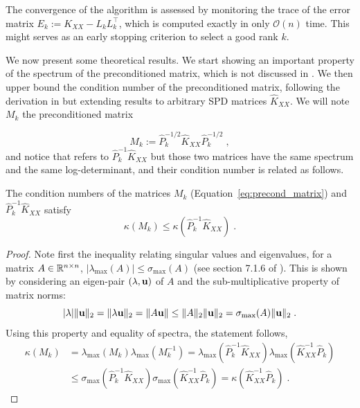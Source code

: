 \documentclass{article}
\begin{document}
The convergence of the algorithm is assessed by monitoring the trace of the error matrix $E_k := K_{XX} - L_kL_k^\top$, which is computed exactly in only $\mathcal O(n)$ time. This might serves as an early stopping criterion to select a good rank $k$. 

We now present some theoretical results. We start showing an important property of the spectrum of the preconditioned matrix, which is not discussed in \cite{gardner_gpytorch_2021}. We then upper bound the condition number of the preconditioned matrix, following the derivation in \cite{gardner_gpytorch_2021} but extending results to arbitrary SPD matrices $\widehat K_{XX}$. We will note $M_k$ the preconditioned matrix

\begin{equation} \label{eq:precond_matrix}
    M_k := \widehat P_k^{-1/2} \widehat K_{XX} \widehat P_k^{-1/2} \;,
\end{equation}
%
and notice that \cite{gardner_gpytorch_2021} refers to $\widehat P_k^{-1} \widehat K_{XX}$ but those two matrices have the same spectrum and the same log-determinant, and their condition number is related as follows.

\begin{proposition} \label{thm:condnums}
The condition numbers of the matrices $M_k$ (Equation~\eqref{eq:precond_matrix}) and $\widehat P_k^{-1} \widehat K_{XX}$ satisfy
\begin{equation*}
    \kappa(M_k) \le \kappa(\widehat P_k^{-1} \widehat K_{XX}) \;.
\end{equation*}
\end{proposition}
\begin{proof}
Note first the inequality relating singular values and eigenvalues, for a matrix $A \in \mathbb R^{n\times n}$, $|\lambda_{\max}(A)| \le \sigma_{\max}(A)$ (see section 7.1.6 of \cite{golub_matrix_2013}). This is shown by considering an eigen-pair $(\lambda, \boldsymbol{\mathbf{u}})$ of $A$ and the sub-multiplicative property of matrix norms:
\begin{equation*}
    |\lambda| \Vert \boldsymbol{\mathbf{u}} \Vert_2 = \Vert \lambda \boldsymbol{\mathbf{u}} \Vert_2 = \Vert A \boldsymbol{\mathbf{u}} \Vert \le \Vert A \Vert_2 \Vert \boldsymbol{\mathbf{u}} \Vert_2 = \sigma_{\max}(A) \Vert \boldsymbol{\mathbf{u}} \Vert_2 \;.
\end{equation*}
%
Using this property and equality of spectra, the statement follows,
\begin{align*}
    \kappa(M_k) &= \lambda_{\max}(M_k) \lambda_{\max}(M_k^{-1}) 
    = \lambda_{\max}(\widehat P_k^{-1} \widehat K_{XX}) \lambda_{\max}( \widehat K_{XX}^{-1} \widehat P_k) \\
    &\le \sigma_{\max}(\widehat P_k^{-1} \widehat K_{XX}) \sigma_{\max}(\widehat K_{XX}^{-1} \widehat P_k) = \kappa(\widehat K_{XX}^{-1} \widehat P_k) \; .
\end{align*}
\end{proof}
\end{document}
